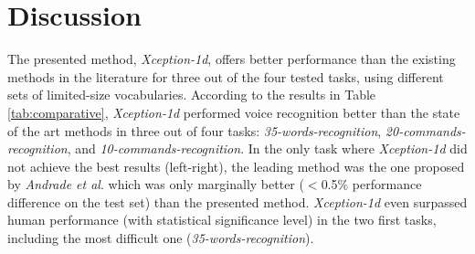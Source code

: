 \begin{table}[h!]
\begin{subtable}{1\textwidth}
\end{subtable}
\bigskip
\begin{subtable}{1\textwidth}
\caption{Results for version 2 of the dataset.}
		\centering
{}
\end{subtable}
\end{table}


\section{Discussion} \label{sec:discussion}

The presented method, \textit{Xception-1d}, offers better performance than the existing methods in the literature for three out of the four tested tasks, using different sets of limited-size vocabularies. According to the results in Table \ref{tab:comparative}, \textit{Xception-1d} performed voice recognition better than the state of the art methods  \autocite{Andrade2018, Zhang2017, Mcmahan2017, Warden2018} in three out of four tasks: \textit{35-words-recognition}, \textit{20-commands-recognition}, and \textit{10-commands-recognition}. In the only task where \textit{Xception-1d} did not achieve the best results (left-right), the leading method was the one proposed by \textit{Andrade et al}. \autocite{Andrade2018} which was only marginally better ($<$0.5\% performance difference on the test set) than the presented method. \textit{Xception-1d} even surpassed human performance (with statistical significance level) in the two first tasks, including the most difficult one (\textit{35-words-recognition}).

